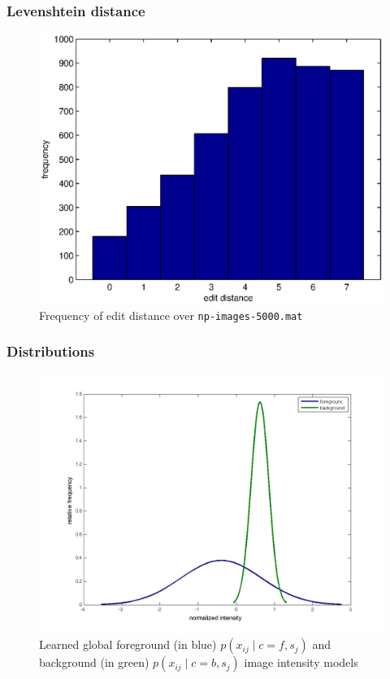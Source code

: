 \documentclass{beamer}
\begin{document}
\begin{frame}
  \frametitle{Levenshtein distance}
  \begin{figure}
\begin{center}
\includegraphics[width=0.75\linewidth]{pics/hamming.eps}
\caption{ Frequency of edit distance over \texttt{np-images-5000.mat}  } 
\label{fig:editdistance}
\end{center}
\end{figure}
\end{frame}

\begin{frame}
  \frametitle{Distributions}
\begin{figure}[htp]
\centering
\includegraphics[width=0.75\linewidth]{pics/distribution.png}
\caption{ Learned global foreground (in blue) $ p(x_{ij}\mid c=f,s_j)$ and
  background (in green) $p(x_{ij} \mid c=b,s_j)$ image intensity models }
\label{fig:distribution}
\end{figure}
\end{frame}
\end{document}
